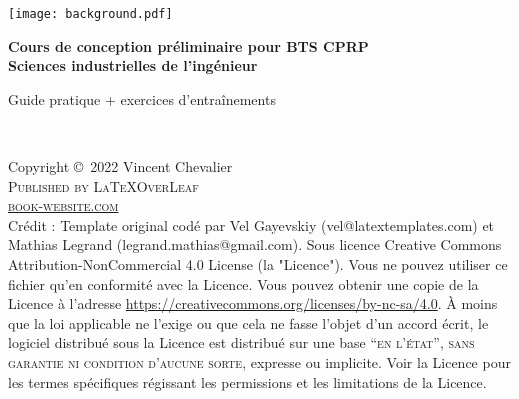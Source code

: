 \documentclass[
	11pt, %
	fleqn, %
	a4paper, %
]{LegrandOrangeBook}
\begin{document}
\usetikzlibrary{patterns} %


\titlepage %
	{\texttt{[image: background.pdf]}} %
	{ %
		\centering\sffamily %
		{\Huge\bfseries Cours de conception préliminaire pour BTS CPRP\\ Sciences industrielles de l'ingénieur\par} %
		\vspace{16pt} %
		{\LARGE Guide pratique + exercices d'entraînements\par} %
		\vspace{24pt} %
		{\huge\bfseries \par} %
	}


\thispagestyle{empty} %

~\vfill %

\noindent Copyright \copyright\ 2022 Vincent Chevalier\\ %

\noindent \textsc{Published by \LaTeX OverLeaf}\\ %

\noindent \textsc{\href{https://www.latextemplates.com/template/legrand-orange-book}{book-website.com}}\\ %
\noindent
Crédit : Template original codé par Vel Gayevskiy (vel@latextemplates.com) et Mathias Legrand (legrand.mathias@gmail.com). Sous licence Creative Commons Attribution-NonCommercial 4.0 License (la "Licence"). Vous ne pouvez utiliser ce fichier qu'en conformité avec la Licence. Vous pouvez obtenir une copie de la Licence à l'adresse  \url{https://creativecommons.org/licenses/by-nc-sa/4.0}. À moins que la loi applicable ne l'exige ou que cela ne fasse l'objet d'un accord écrit, le logiciel distribué sous la Licence est distribué sur une base \textsc{``en l'état'', sans garantie ni condition d'aucune sorte}, expresse ou implicite. Voir la Licence pour les termes spécifiques régissant les permissions et les limitations de la Licence.\\ %
\end{document}
